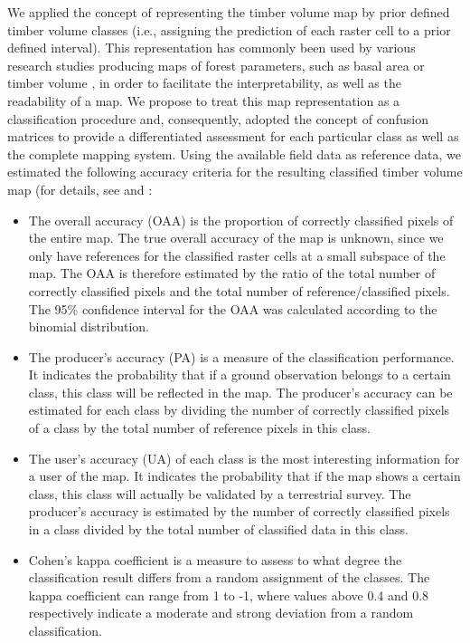 We applied the concept of representing the timber volume map by prior defined timber volume classes (i.e., assigning the prediction of each raster cell to a prior defined interval). This representation has commonly been used by various research studies producing maps of forest parameters, such as basal area or timber volume \citep{tonolli2011, latifi2010, clementel2012}, in order to facilitate the interpretability, as well as the readability of a map. We propose to treat this map representation as a classification procedure and, consequently, adopted the concept of confusion matrices to provide a differentiated assessment for each particular class as well as the complete mapping system. Using the available field data as reference data, we estimated the following accuracy criteria for the resulting classified timber volume map (for details, see \citet{congalton2008} and \citet{richards1999}:

\begin{itemize}
	\item The overall accuracy (OAA) is the proportion of correctly classified pixels of the entire map. The true overall accuracy of the map is unknown, since we only have references for the classified raster cells at a small subspace of the map. The OAA is therefore estimated by the ratio of the total number of correctly classified pixels and the total number of reference/classified pixels. The 95\% confidence interval for the OAA was calculated according to the binomial distribution.
	\item 	The producer's accuracy (PA) is a measure of the classification performance. It indicates the probability that if a ground observation belongs to a certain class, this class will be reflected in the map. The producer's accuracy can be estimated for each class by dividing the number of correctly classified pixels of a class by the total number of reference pixels in this class.
	\item The user's accuracy (UA) of each class is the most interesting information for a user of the map. It indicates the probability that if the map shows a certain class, this class will actually be validated by a terrestrial survey. The producer's accuracy is estimated by the number of correctly classified pixels in a class divided by the total number of classified data in this class.
	\item Cohen's kappa coefficient is a measure to assess to what degree the classification result differs from a random assignment of the classes. The kappa coefficient can range from  1 to -1, where values above 0.4 and 0.8 respectively indicate a moderate and strong deviation from a random classification.
\end{itemize}

